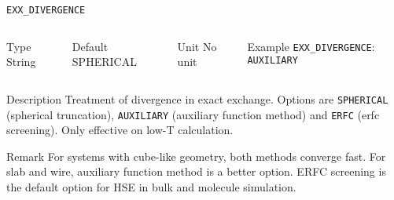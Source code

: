     
    \begin{frame}[allowframebreaks]{\texttt{EXX\_DIVERGENCE}} \label{EXX_DIVERGENCE}
    \vspace*{-12pt}
    \begin{columns}
    \begin{block}{Type}
    String
    \end{block}
    
    \begin{block}{Default}
    SPHERICAL
    \end{block}
    
    \begin{block}{Unit}
    No unit
    \end{block}
    
    \begin{block}{Example}
    \texttt{EXX\_DIVERGENCE}: \texttt{AUXILIARY}
    \end{block}
    \end{columns}
    
    \begin{block}{Description}
    Treatment of divergence in exact exchange. Options are \texttt{SPHERICAL} (spherical truncation), 
    \texttt{AUXILIARY} (auxiliary function method) and \texttt{ERFC} (erfc screening). Only effective on low-T calculation.
    \end{block}
    
    \begin{block}{Remark}
    For systems with cube-like geometry, both methods converge fast. For slab and wire, auxiliary function method is a better option. 
    ERFC screening is the default option for HSE in bulk and molecule simulation.
    \end{block}
    
    \end{frame}
    
